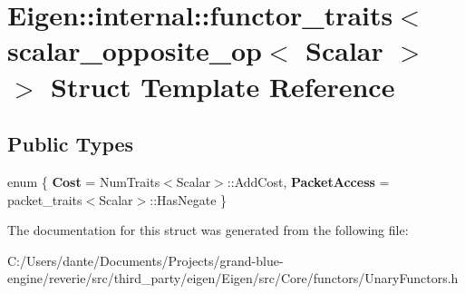 \hypertarget{struct_eigen_1_1internal_1_1functor__traits_3_01scalar__opposite__op_3_01_scalar_01_4_01_4}{}\section{Eigen\+::internal\+::functor\+\_\+traits$<$ scalar\+\_\+opposite\+\_\+op$<$ Scalar $>$ $>$ Struct Template Reference}
\label{struct_eigen_1_1internal_1_1functor__traits_3_01scalar__opposite__op_3_01_scalar_01_4_01_4}
\subsection*{Public Types}
\begin{DoxyCompactItemize}
\item 
\mbox{\label{struct_eigen_1_1internal_1_1functor__traits_3_01scalar__opposite__op_3_01_scalar_01_4_01_4_a4efabfdeffd25d5685475c50acc739e5}} 
enum \{ {\bfseries Cost} = Num\+Traits$<$Scalar$>$\+::Add\+Cost, 
{\bfseries Packet\+Access} = packet\+\_\+traits$<$Scalar$>$\+::Has\+Negate
 \}
\end{DoxyCompactItemize}


The documentation for this struct was generated from the following file\+:\begin{DoxyCompactItemize}
\item 
C\+:/\+Users/dante/\+Documents/\+Projects/grand-\/blue-\/engine/reverie/src/third\+\_\+party/eigen/\+Eigen/src/\+Core/functors/Unary\+Functors.\+h\end{DoxyCompactItemize}
